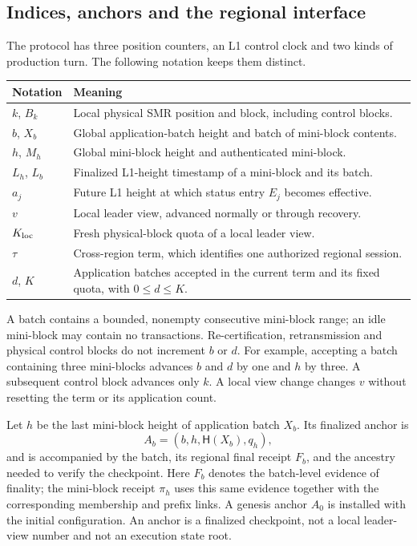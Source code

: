 \documentclass[11pt,a4paper,onecolumn]{article}
\newcommand{\Hash}{\mathsf H}
\newcounter{protocol}
\begin{document}
\subsection{Indices, anchors and the regional interface}\label{sec:indices}
The protocol has three position counters, an L1 control clock and two kinds
of production turn.
The following notation keeps them distinct.
\begin{center}\small
\begin{tabularx}{\linewidth}{@{}p{.16\linewidth}Y@{}}\toprule
Notation & Meaning\\\midrule
$k$, $B_k$ & Local physical SMR position and block, including control blocks.\\
$b$, $X_b$ & Global application-batch height and batch of mini-block contents.\\
$h$, $M_h$ & Global mini-block height and authenticated mini-block.\\
$L_h$, $L_b$ & Finalized L1-height timestamp of a mini-block and its batch.\\
$a_j$ & Future L1 height at which status entry $E_j$ becomes effective.\\
$v$ & Local leader view, advanced normally or through recovery.\\
$K_{\rm loc}$ & Fresh physical-block quota of a local leader view.\\
$\tau$ & Cross-region term, which identifies one authorized regional session.\\
$d$, $K$ & Application batches accepted in the current term and its fixed quota,
with $0\leq d\leq K$.\\\bottomrule
\end{tabularx}
\end{center}
A batch contains a bounded, nonempty consecutive mini-block range; an idle
mini-block may contain no transactions. Re-certification, retransmission
and physical control blocks do not increment $b$ or $d$. For example,
accepting a batch containing three mini-blocks advances $b$ and $d$ by one and $h$
by three. A subsequent control block advances only $k$. A local view change
changes $v$ without resetting the term or its application count.

Let $h$ be the last mini-block height of application batch $X_b$.
Its finalized anchor is
\[
 A_b=(b,h,\Hash(X_b),q_h),
\]
and is accompanied by the batch, its regional final receipt $F_b$, and
the ancestry needed to verify the checkpoint. Here $F_b$ denotes the
batch-level evidence of finality; the mini-block receipt $\pi_h$ uses this
same evidence together with the corresponding membership and prefix links.
A genesis anchor $A_0$ is installed with the
initial configuration. An anchor is a finalized checkpoint, not a local
leader-view number and not an execution state root.
\end{document}
